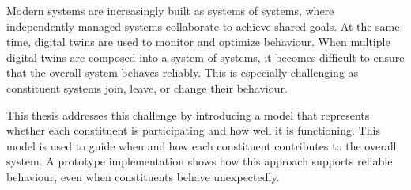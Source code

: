 
Modern systems are increasingly built as systems of systems, where independently managed systems collaborate to achieve shared goals. At the same time, digital twins are used to monitor and optimize behaviour. When multiple digital twins are composed into a system of systems, it becomes difficult to ensure that the overall system behaves reliably. This is especially challenging as constituent systems join, leave, or change their behaviour.

This thesis addresses this challenge by introducing a model that represents whether each constituent is participating and how well it is functioning. This model is used to guide when and how each constituent contributes to the overall system. A prototype implementation shows how this approach supports reliable behaviour, even when constituents behave unexpectedly.